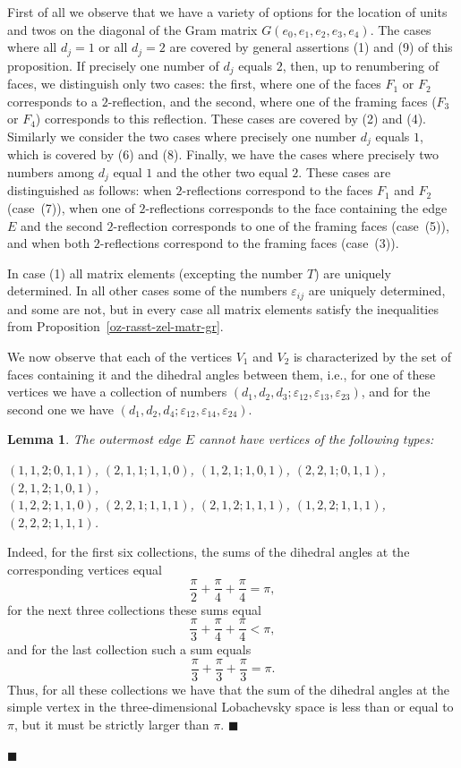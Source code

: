 \documentclass[14pt]{article}
\newtheorem{lemma}{\indent Lemma}[section]
\newenvironment{proof}                    
       {\par\indent{\bf Proof. }} 
	        {\hfill $\scriptstyle\blacksquare$}
\begin{document}
\begin{proof}
First of all we observe
that we have a variety of options for the location of units and twos on the
diagonal of the Gram matrix $G(e_0, e_1, e_2, e_3, e_4)$. The cases where
 all $d_j = 1$ or
all $d_j = 2$ are covered by general assertions (1) and (9) of this proposition.
If precisely one number of $d_j$ equals  $2$, then, up to renumbering
 of faces, we distinguish  only two cases: the first, where
  one of the faces $F_1$ or $F_2$
corresponds to a $2$-reflection, and the second, where one of the framing faces
($F_3$ or $F_4$) corresponds to this reflection.
These cases are covered by
(2) and (4). Similarly we consider the two cases where
precisely one number  $d_j$ equals $1$, which is covered by
(6) and (8). Finally, we have the cases where
precisely two numbers among $d_j$  equal $1$ and the other two equal $2$.
These cases are distinguished as follows: when $2$-reflections correspond
to the faces $F_1$ and $F_2$ (case~(7)), when one of  $2$-reflections
corresponds to the face containing
the edge $E$ and the second $2$-reflection
 corresponds to one of the framing faces (case~(5)),
and when both $2$-reflections correspond
to the framing faces (case~(3)).

In  case (1) all matrix elements (excepting the number $T$) are uniquely
determined. In all other
cases some of the numbers $\varepsilon_{ij}$ are uniquely determined,
and some are not, but in every
case all matrix elements satisfy the inequalities from
Proposition~\ref{oz-rasst-zel-matr-gr}.

We now observe that each of the vertices  $V_1$ and $V_2$ is characterized  by
the set of faces containing it
and the dihedral angles between them, i.e., for one of these vertices  we have a collection of
numbers
$(d_1, d_2, d_3; \varepsilon_{12}, \varepsilon_{13}, \varepsilon_{23})$,
and for the second one we have
$(d_1, d_2, d_4; \varepsilon_{12}, \varepsilon_{14}, \varepsilon_{24})$.

\begin{lemma}\label{vertices}
The outermost edge $E$ cannot have vertices of the following types:

$(1, 1, 2; 0, 1, 1)$, $(2, 1, 1; 1, 1, 0)$, $(1, 2, 1; 1, 0, 1)$,
$(2, 2, 1; 0, 1, 1)$, $(2, 1, 2; 1, 0, 1)$,\\
$(1, 2, 2; 1, 1, 0)$,
$(2, 2, 1; 1, 1, 1)$, $(2, 1, 2; 1, 1, 1)$, $(1, 2, 2; 1, 1, 1)$,
$(2, 2, 2; 1, 1, 1)$.
\end{lemma}
\begin{proof}
Indeed, for the first six collections, the sums of the dihedral angles at the corresponding vertices  equal
$$
\dfrac{\pi}{2}+\dfrac{\pi}{4}+\dfrac{\pi}{4} = \pi,
$$
for the next three collections these sums equal
$$
\dfrac{\pi}{3}+\dfrac{\pi}{4}+\dfrac{\pi}{4} < \pi,
$$
and for the last collection such a sum  equals
$$
\dfrac{\pi}{3}+\dfrac{\pi}{3}+\dfrac{\pi}{3} = \pi.
$$
Thus,
for all these collections we have that the sum of the dihedral angles at the simple vertex
in the three-dimensional Lobachevsky space is less than or equal to $\pi$, but it must be strictly larger than $\pi$.
\end{proof}


\end{proof}
\end{document}
